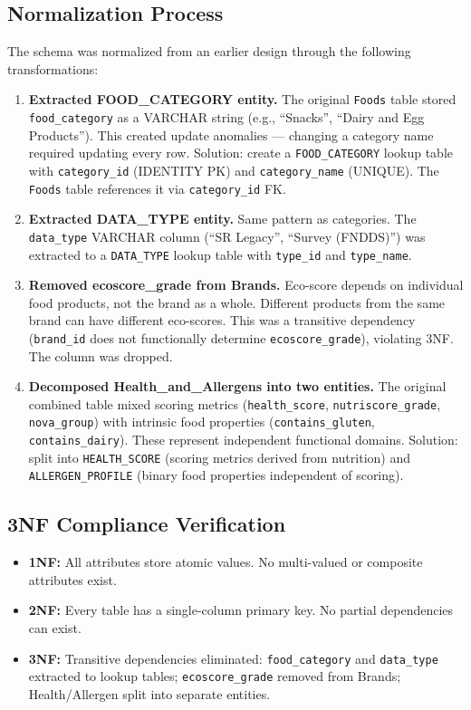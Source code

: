 \documentclass[12pt,a4paper]{article}
\begin{document}
\subsection{Normalization Process}

The schema was normalized from an earlier design through the following transformations:

\begin{enumerate}
    \item \textbf{Extracted FOOD\_CATEGORY entity.} The original \texttt{Foods} table stored \texttt{food\_category} as a VARCHAR string (e.g., ``Snacks'', ``Dairy and Egg Products''). This created update anomalies — changing a category name required updating every row. Solution: create a \texttt{FOOD\_CATEGORY} lookup table with \texttt{category\_id} (IDENTITY PK) and \texttt{category\_name} (UNIQUE). The \texttt{Foods} table references it via \texttt{category\_id} FK.

    \item \textbf{Extracted DATA\_TYPE entity.} Same pattern as categories. The \texttt{data\_type} VARCHAR column (``SR Legacy'', ``Survey (FNDDS)'') was extracted to a \texttt{DATA\_TYPE} lookup table with \texttt{type\_id} and \texttt{type\_name}.

    \item \textbf{Removed ecoscore\_grade from Brands.} Eco-score depends on individual food products, not the brand as a whole. Different products from the same brand can have different eco-scores. This was a transitive dependency (\texttt{brand\_id} does not functionally determine \texttt{ecoscore\_grade}), violating 3NF. The column was dropped.

    \item \textbf{Decomposed Health\_and\_Allergens into two entities.} The original combined table mixed scoring metrics (\texttt{health\_score}, \texttt{nutriscore\_grade}, \texttt{nova\_group}) with intrinsic food properties (\texttt{contains\_gluten}, \texttt{contains\_dairy}). These represent independent functional domains. Solution: split into \texttt{HEALTH\_SCORE} (scoring metrics derived from nutrition) and \texttt{ALLERGEN\_PROFILE} (binary food properties independent of scoring).
\end{enumerate}

\subsection{3NF Compliance Verification}
\begin{itemize}[nosep]
    \item \textbf{1NF:} All attributes store atomic values. No multi-valued or composite attributes exist.
    \item \textbf{2NF:} Every table has a single-column primary key. No partial dependencies can exist.
    \item \textbf{3NF:} Transitive dependencies eliminated: \texttt{food\_category} and \texttt{data\_type} extracted to lookup tables; \texttt{ecoscore\_grade} removed from Brands; Health/Allergen split into separate entities.
\end{itemize}
\end{document}

